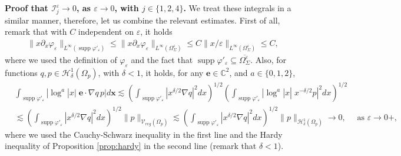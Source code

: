 \documentclass[report]{elsarticle}
\numberwithin{theorem}{section}
\renewcommand{\vec}[1]{\mathbf{#1}}
\newcommand{\re}{\varepsilon}
\begin{document}
	\textbf{Proof that $\mathcal{I}_j^{\varepsilon}\rightarrow 0$, as $\varepsilon\rightarrow 0$, with $j\in\{1,2,4\}$.} We treat these integrals in a similar manner, therefore, let us combine the relevant estimates. First of all, remark that with $C$ independent on $\re$, it holds
	\begin{align}
		\label{eq:est1}
		\| x \partial_x\varphi_{\varepsilon}\|_{L^{\infty}(\operatorname{supp}\varphi'_{\re})}\leq \| x \partial_x\varphi_{\varepsilon}\|_{L^{\infty}(\Omega^{\re}_{\Sigma})}\leq C\|x/\re\|_{L^{\infty}(\Omega^{\re}_{\Sigma})}\leq C,
	\end{align}
	where we used the definition of $\varphi_{\re}$ and the fact that $\operatorname{supp}\varphi'_{\re}\subseteq \overline{\Omega_{\Sigma}^{\re}}$. 
	Also, for functions $q,p\in \mathcal{H}^1_{\delta}(\Omega_p)$, with $\delta<1$, it holds, for any $\mathbf{e}\in \mathbb{C}^2$, and $a\in \{0,1,2\}$,
	\begin{align}
		\nonumber
		&\int_{\operatorname{supp}\varphi'_{\varepsilon}}|\log^a|x|\;\mathbf{e}\cdot\nabla q \, p|d\vec{x}\lesssim 
		\left(\int_{\operatorname{supp}\varphi'_{\varepsilon}}|x^{\delta/2}\nabla q|^2dx\right)^{1/2}\left(\int_{\operatorname{supp}\varphi'_{\varepsilon}}|\log^a|x|\;x^{-\delta/2}p|^2dx\right)^{1/2}\\
		\label{eq:funeq}
		&\lesssim \left(\int_{\operatorname{supp}\varphi'_{\varepsilon}}|x^{\delta/2}\nabla q|^2dx\right)^{1/2}\|p\|_{\mathcal{V}_{reg}(\Omega_p)}\lesssim \left(\int_{\operatorname{supp}\varphi'_{\varepsilon}}|x^{\delta/2}\nabla q|^2dx\right)^{1/2}\|p\|_{\mathcal{H}^1_{\delta}(\Omega_p)}\rightarrow 0, \quad \text{ as }\varepsilon\rightarrow 0+,
	\end{align} 
	where we used the Cauchy-Schwarz inequality in the first line and the Hardy inequality of Proposition \ref{prop:hardy} in the second line (remark that $\delta<1$). 
	
\end{document}
